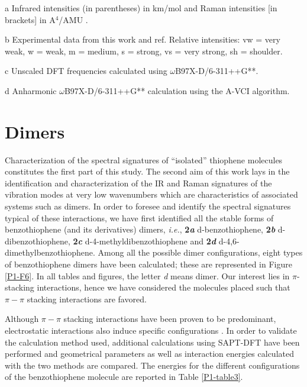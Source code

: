 \begin{table}[H]
\begin{center}
\begin{threeparttable}[b]
				\begin{tablenotes}
					\item[a] Infrared intensities (in parentheses) in km/mol and Raman intensities [in brackets] in A$^{4}$/AMU .
					\item[b] Experimental data from this work and ref\cite{bree1971vibrations}. Relative intensities: vw = very weak, w = weak, m = medium, s = strong, vs = very strong, sh = shoulder.
					\item[c] Unscaled DFT frequencies calculated using $\omega$B97X-D/6-311++G**.
					\item[d] Anharmonic $\omega$B97X-D/6-311++G** calculation using the A-VCI algorithm\cite{garnier2016adaptive}.
				\end{tablenotes}
			\end{threeparttable}
		\end{center}
	\end{table}
	
	
	
	
	
	\section*{Dimers}
	
	Characterization of the spectral signatures of “isolated” thiophene molecules constitutes the first part of this study. The second aim of this work lays in the identification and characterization of the IR and Raman signatures of the vibration modes at very low wavenumbers which are characteristics of associated systems such as dimers. In order to foresee and identify the spectral signatures typical of these interactions, we have first identified all the stable forms of benzothiophene (and its derivatives) dimers, \textit{i.e.}, \textbf{2\textit{a}} d-benzothiophene, \textbf{2\textit{b}} d-dibenzothiophene, \textbf{2\textit{c}} d-4-methyldibenzothiophene and \textbf{2\textit{d}} d-4,6-dimethylbenzothiophene. Among all the possible dimer configurations, eight types of benzothiophene dimers have been calculated; these are represented in Figure \ref{P1-F6}. In all tables and figures, the letter \textit{d} means dimer.  Our interest lies in $\pi$-stacking interactions, hence we have considered the molecules placed such that $\pi-\pi$ stacking interactions are favored.
	
	Although $\pi-\pi$ stacking interactions have been proven to be predominant, electrostatic interactions also induce specific configurations \cite{liu2014adjusting}. In order to validate the calculation method used, additional calculations using SAPT-DFT have been performed and geometrical parameters as well as interaction energies calculated with the two methods are compared. The energies for the different configurations of the benzothiophene molecule are reported in Table \ref{P1-table3}. 
	
